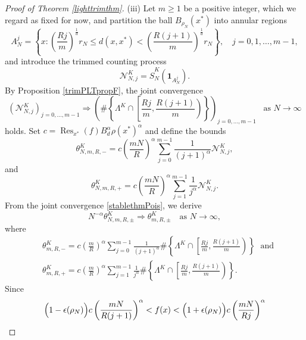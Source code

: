 \documentclass[11pt,twoside,a4paper,reqno]{amsart}
\newcommand{\Res}{\operatorname{Res}}
\newcommand{\as}[1]{\text{as } #1 \rightarrow\infty}
\def\one{{\mathbf{1}}}
\begin{document}
\begin{proof}[Proof of Theorem \ref{lighttrimthm}]
(iii) Let $m\geq 1$ be a positive integer, which we regard as fixed for now, and partition the ball $B_{\rho_N}(x^*)$ into annular regions
\begin{equation*}
A_N^j = \left\{ x : \left( \frac{ R j}{m} \right)^{\frac{1}{d}} r_N \leq d(x, x^*) < \left( \frac{R (j+1)}{m} \right)^{\frac{1}{d}} r_N \right\}, \quad j=0,1,\ldots,m-1,
\end{equation*}
and introduce the trimmed counting process
\begin{equation*}
\mathcal{N}_{N,j}^K = \hat{S}_N^K \left(\one_{A_N^j}\right).
\end{equation*}
By Proposition \ref{trimPLTpropF}, the joint convergence
\begin{equation}\label{stablethmPois}
\left( \mathcal{N}_{N,j}^K \right)_{j=0,\dots,m-1} \Rightarrow \left( \# \left\{\Lambda^K \cap \left[\frac{Rj}{m},\frac{R(j+1)}{m}\right) \right\} \right)_{j=0,\dots,m-1} \;\;\;\as{N}
\end{equation}
holds. Set $c=\Res_{x^*}(f) B_d^{\alpha} \rho(x^*)^{\alpha}$ and define the bounds
\begin{equation*}
\theta_{N,m,R,-}^K = c \left(\frac{mN}{R}\right)^{\alpha} \sum_{j=0}^{m-1} \frac{1}{(j+1)^{\alpha}} \mathcal{N}_{N,j}^K,
\end{equation*}
and
\begin{equation*}
\theta_{N,m,R,+}^K = c \left(\frac{mN}{R}\right)^{\alpha} \sum_{j=1}^{m-1} \frac{1}{j^{\alpha}} \mathcal{N}_{N,j}^K.
\end{equation*}
From the joint convergence \eqref{stablethmPois}, we derive
\begin{equation}\label{thetaweakcon}
N^{-\alpha} \theta_{N,m,R,\pm}^K \Rightarrow \theta_{m,R,\pm}^K \quad \as{N},
\end{equation}
where
\begin{align*}
&\theta_{m,R,-}^K = c \left(\frac{m}{R}\right)^{\alpha} \sum_{j=0}^{m-1} \frac{1}{(j+1)^{\alpha}} \# \left\{\Lambda^K \cap \left[\frac{Rj}{m},\frac{R(j+1)}{m}\right) \right\} \; \text{ and}\\
&\theta_{m,R,+}^K = c \left(\frac{m}{R}\right)^{\alpha} \sum_{j=1}^{m-1} \frac{1}{j^{\alpha}} \# \left\{\Lambda^K \cap \left[\frac{Rj}{m},\frac{R(j+1)}{m}\right) \right\}.
\end{align*}
Since
\begin{equation*}
\Bigl(1-\epsilon(\rho_N)\Bigr)c\left(\frac{mN}{R(j+1)}\right)^\alpha<f(x)
<\Bigl(1+\epsilon(\rho_N)\Bigr)c\left(\frac{mN}{Rj}\right)^\alpha
\end{equation*}

\end{proof}
\end{document}
